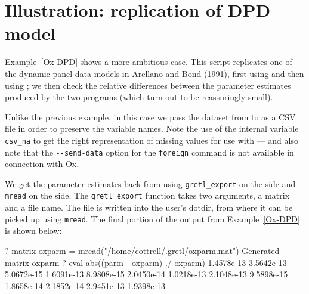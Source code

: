 \section{Illustration: replication of DPD model}
\label{sec:dpd-replication}

Example~\ref{Ox-DPD} shows a more ambitious case.  This script
replicates one of the dynamic panel data models in Arellano and Bond
(1991), first using  and then using ; we then check
the relative differences between the parameter estimates produced by
the two programs (which turn out to be reassuringly small).

Unlike the previous example, in this case we pass the dataset from
 to  as a CSV file in order to preserve the
variable names.  Note the use of the internal variable \verb|csv_na|
to get the right representation of missing values for use with
 --- and also note that the \verb|--send-data| option for the
\texttt{foreign} command is not available in connection with Ox.

We get the parameter estimates back from  using
\verb|gretl_export| on the  side and \texttt{mread} on the
 side.  The \verb|gretl_export| function takes two
arguments, a matrix and a file name.  The file is written into the
user's dotdir, from where it can be picked up using \texttt{mread}.
The final portion of the output from Example~\ref{Ox-DPD} is shown
below:
%
\begin{code}
? matrix oxparm = mread("/home/cottrell/.gretl/oxparm.mat")
Generated matrix oxparm
? eval abs((parm - oxparm) ./ oxparm)
  1.4578e-13 
  3.5642e-13 
  5.0672e-15 
  1.6091e-13 
  8.9808e-15 
  2.0450e-14 
  1.0218e-13 
  2.1048e-13 
  9.5898e-15 
  1.8658e-14 
  2.1852e-14 
  2.9451e-13 
  1.9398e-13 
\end{code}


